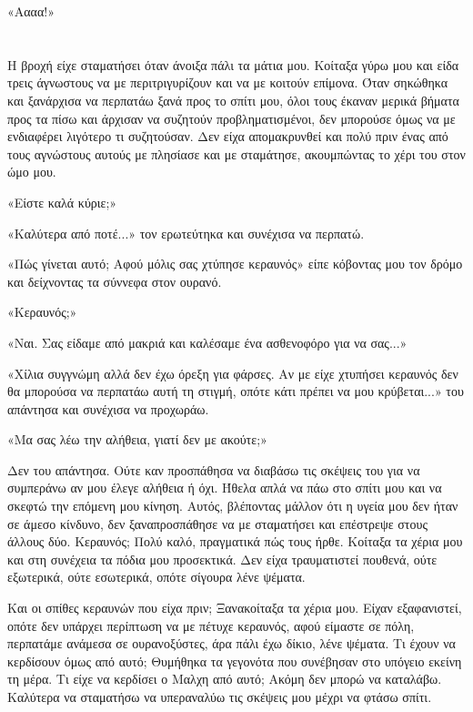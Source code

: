 \documentclass[12pt,twoside, openany]{book}
\begin{document}
«Αααα!»

\chapter{}

Η βροχή είχε σταματήσει όταν άνοιξα πάλι τα μάτια μου. Κοίταξα γύρω μου και είδα τρεις άγνωστους να με περιτριγυρίζουν και να με κοιτούν επίμονα. Όταν σηκώθηκα και ξανάρχισα να περπατάω ξανά προς το σπίτι μου, όλοι τους έκαναν μερικά βήματα προς τα πίσω και άρχισαν να συζητούν προβληματισμένοι, δεν μπορούσε όμως να με ενδιαφέρει λιγότερο τι συζητούσαν. Δεν είχα απομακρυνθεί και πολύ πριν ένας από τους αγνώστους αυτούς με πλησίασε και με σταμάτησε, ακουμπώντας το χέρι του στον ώμο μου.

«Είστε καλά κύριε;»

«Καλύτερα από ποτέ...» τον ερωτεύτηκα και συνέχισα να περπατώ.

«Πώς γίνεται αυτό; Αφού μόλις σας χτύπησε κεραυνός» είπε κόβοντας μου τον δρόμο και δείχνοντας τα σύννεφα στον ουρανό.

«Κεραυνός;»

«Ναι. Σας είδαμε από μακριά και καλέσαμε ένα ασθενοφόρο για να σας...»

«Χίλια συγγνώμη αλλά δεν έχω όρεξη για φάρσες. Αν με είχε χτυπήσει κεραυνός δεν θα μπορούσα να περπατάω αυτή τη στιγμή, οπότε κάτι πρέπει να μου κρύβεται...» του απάντησα και συνέχισα να προχωράω.

«Μα σας λέω την αλήθεια, γιατί δεν με ακούτε;»

Δεν του απάντησα. Ούτε καν προσπάθησα να διαβάσω τις σκέψεις του για να συμπεράνω αν μου έλεγε αλήθεια ή όχι. Ήθελα απλά να πάω στο σπίτι μου και να σκεφτώ την επόμενη μου κίνηση. Αυτός, βλέποντας μάλλον ότι η υγεία μου δεν ήταν σε άμεσο κίνδυνο, δεν ξαναπροσπάθησε να με σταματήσει και επέστρεψε στους άλλους δύο. Κεραυνός; Πολύ καλό, πραγματικά πώς τους ήρθε. Κοίταξα τα χέρια μου και στη συνέχεια τα πόδια μου προσεκτικά. Δεν είχα τραυματιστεί πουθενά, ούτε εξωτερικά, ούτε εσωτερικά, οπότε σίγουρα λένε ψέματα.

Και οι σπίθες κεραυνών που είχα πριν; Ξανακοίταξα τα χέρια μου. Είχαν εξαφανιστεί, οπότε δεν υπάρχει περίπτωση να με πέτυχε κεραυνός, αφού είμαστε σε πόλη, περπατάμε ανάμεσα σε ουρανοξύστες, άρα πάλι έχω δίκιο, λένε ψέματα. Τι έχουν να κερδίσουν όμως από αυτό; Θυμήθηκα τα γεγονότα που συνέβησαν στο υπόγειο εκείνη τη μέρα. Τι είχε να κερδίσει ο Μαλχη από αυτό; Ακόμη δεν μπορώ να καταλάβω. Καλύτερα να σταματήσω να υπεραναλύω τις σκέψεις μου μέχρι να φτάσω σπίτι.\\\\
\end{document}
